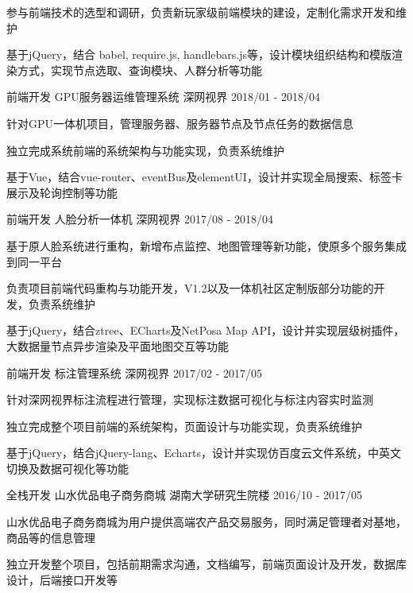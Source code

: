 \begin{cventries}
{\begin{cvitems}
        \item {参与前端技术的选型和调研，负责新玩家级前端模块的建设，定制化需求开发和维护}
        \item {基于jQuery，结合 babel, require.js, handlebars.js等，设计模块组织结构和模版渲染方式，实现节点选取、查询模块、人群分析等功能}
      \end{cvitems}
    }
  \cventry
    {前端开发}
    {GPU服务器运维管理系统}
    {深网视界}
    {2018/01 - 2018/04}
    {
      \begin{cvitems}
        \item {针对GPU一体机项目，管理服务器、服务器节点及节点任务的数据信息}
        \item {独立完成系统前端的系统架构与功能实现，负责系统维护}
        \item {基于Vue，结合vue-router、eventBus及elementUI，设计并实现全局搜索、标签卡展示及轮询控制等功能}
      \end{cvitems}
    }
  \cventry
    {前端开发}
    {人脸分析一体机}
    {深网视界}
    {2017/08 - 2018/04}
    {
      \begin{cvitems}
        \item {基于原人脸系统进行重构，新增布点监控、地图管理等新功能，使原多个服务集成到同一平台}
        \item {负责项目前端代码重构与功能开发，V1.2以及一体机社区定制版部分功能的开发，负责系统维护}
        \item {基于jQuery，结合ztree、ECharts及NetPosa Map API，设计并实现层级树插件，大数据量节点异步渲染及平面地图交互等功能}
      \end{cvitems}
    }
  \cventry
    {前端开发}
    {标注管理系统}
    {深网视界}
    {2017/02 - 2017/05}
    {
      \begin{cvitems}
        \item {针对深网视界标注流程进行管理，实现标注数据可视化与标注内容实时监测}
        \item {独立完成整个项目前端的系统架构，页面设计与功能实现，负责系统维护}
        \item {基于jQuery，结合jQuery-lang、Echarts，设计并实现仿百度云文件系统，中英文切换及数据可视化等功能}
      \end{cvitems}
    }
  \cventry
    {全栈开发}
    {山水优品电子商务商城}
    {湖南大学研究生院楼}
    {2016/10 - 2017/05}
    {
      \begin{cvitems}
        \item {山水优品电子商务商城为用户提供高端农产品交易服务，同时满足管理者对基地，商品等的信息管理}
        \item {独立开发整个项目，包括前期需求沟通，文档编写，前端页面设计及开发，数据库设计，后端接口开发等}

\end{cvitems}}
\end{cventries}
